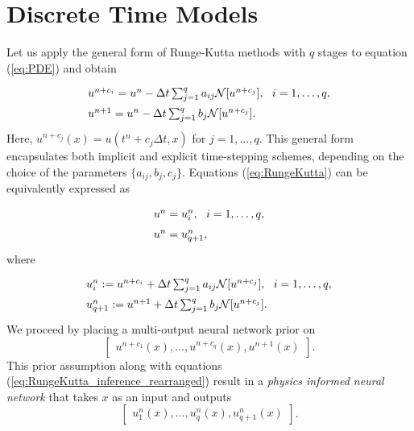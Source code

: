 \documentclass[preprint,12pt]{elsarticle}
\begin{document}
\section{Discrete Time Models}\label{sec:DT_models}
Let us apply the general form of Runge-Kutta methods with $q$ stages \cite{iserles2009first} to equation (\ref{eq:PDE}) and obtain
\begin{equation}\label{eq:RungeKutta}
\arraycolsep=1.0pt\def\arraystretch{1.5}
\begin{array}{ll}
u^{n+c_i} = u^n - \Delta t \sum_{j=1}^q a_{ij} \mathcal{N}[u^{n+c_j}], \ \ i=1,\ldots,q,\\
u^{n+1} = u^{n} - \Delta t \sum_{j=1}^q b_j \mathcal{N}[u^{n+c_j}].
\end{array}
\end{equation}
Here, $u^{n+c_j}(x) = u(t^n + c_j \Delta t, x)$ for $j=1, \ldots, q$. This general form encapsulates both implicit and explicit time-stepping schemes, depending on the choice of the parameters $\{a_{ij},b_j,c_j\}$. Equations (\ref{eq:RungeKutta}) can be equivalently expressed as
\begin{equation}
\arraycolsep=1.0pt\def\arraystretch{1.5}
\begin{array}{ll}
u^{n} = u^n_i, \ \ i=1,\ldots,q,\\
u^n = u^n_{q+1},
\end{array}
\end{equation}
where
\begin{equation}\label{eq:RungeKutta_inference_rearranged}
\arraycolsep=1.0pt\def\arraystretch{1.5}
\begin{array}{ll}
u^n_i := u^{n+c_i} + \Delta t \sum_{j=1}^q a_{ij} \mathcal{N}[u^{n+c_j}], \ \ i=1,\ldots,q,\\
u^n_{q+1} := u^{n+1} + \Delta t \sum_{j=1}^q b_j \mathcal{N}[u^{n+c_j}].
\end{array}
\end{equation}
We proceed by placing a multi-output neural network prior on
\begin{equation}\label{eq:RungeKutta_PU_prior_inference}
\begin{bmatrix}
u^{n+c_1}(x), \ldots, u^{n+c_q}(x), u^{n+1}(x)
\end{bmatrix}.
\end{equation}
This prior assumption along with equations (\ref{eq:RungeKutta_inference_rearranged}) result in a \emph{physics informed neural network} that takes $x$ as an input and outputs
\begin{equation}\label{eq:RungeKutta_PI_prior_inference}
\begin{bmatrix}
u^n_1(x), \ldots, u^n_q(x), u^n_{q+1}(x)
\end{bmatrix}.
\end{equation}
\end{document}
